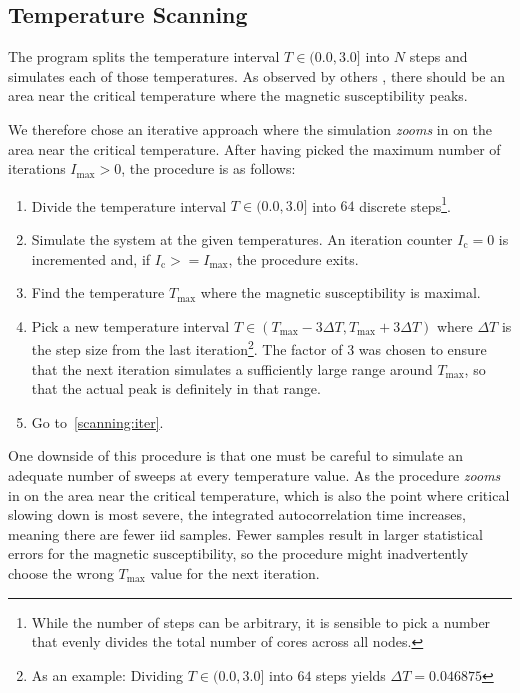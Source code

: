 \subsection{Temperature Scanning}\label{sec:impl:scanning}
	The program splits the temperature interval $T \in (0.0, 3.0]$ into $N$ steps and simulates each of those temperatures.  As observed by others \citep*{olsson_helicity}, there should be an area near the critical temperature where the magnetic susceptibility peaks.
	
	We therefore chose an iterative approach where the simulation \emph{zooms} in on the area near the critical temperature. After having picked the maximum number of iterations $I_\text{max} > 0$, the procedure is as follows:
	\begin{enumerate}
		\item \label{scanning:init} Divide the temperature interval $T \in (0.0, 3.0]$ into $64$ discrete steps\footnote{While the number of steps can be arbitrary, it is sensible to pick a number that evenly divides the total number of cores across all nodes.}.
		\item \label{scanning:iter} Simulate the system at the given temperatures. An iteration counter $I_\text{c} = 0$ is incremented and, if $I_\text{c} >= I_\text{max}$, the procedure exits.
		\item Find the temperature $T_\text{max}$ where the magnetic susceptibility is maximal.
		\item Pick a new temperature interval $T \in (T_\text{max} - 3 \Delta T,  T_\text{max} + 3 \Delta T)$ where $\Delta T$ is the step size from the last iteration\footnote{As an example: Dividing $T \in (0.0, 3.0]$ into $64$ steps yields $\Delta T = \num{0.046875}$}. The factor of $3$ was chosen to ensure that the next iteration simulates a sufficiently large range around $T_\text{max}$, so that the actual peak is definitely in that range.
		\item Go to~\cref{scanning:iter}.
	\end{enumerate}
	One downside of this procedure is that one must be careful to simulate an adequate number of sweeps at every temperature value. As the procedure \emph{zooms} in on the area near the critical temperature, which is also the point where critical slowing down is most severe, the integrated autocorrelation time increases, meaning there are fewer iid samples. Fewer samples result in larger statistical errors for the magnetic susceptibility, so the procedure might inadvertently choose the wrong $T_\text{max}$ value for the next iteration.
